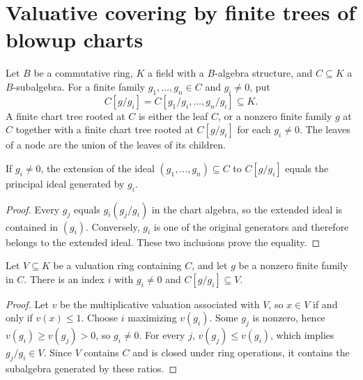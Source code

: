 \section{Valuative covering by finite trees of blowup charts}

\begin{definition}\label{def:sc0-rees-chart-tree}
\leanok
Let $B$ be a commutative ring, $K$ a field with a $B$-algebra structure, and $C\subseteq K$ a
$B$-subalgebra. For a finite family $g_1,\ldots,g_n\in C$ and $g_i\ne0$, put
\[
 C[g/g_i]=C[g_1/g_i,\ldots,g_n/g_i]\subseteq K.
\]
A finite chart tree rooted at $C$ is either the leaf $C$, or a nonzero finite family $g$ at $C$
together with a finite chart tree rooted at $C[g/g_i]$ for each $g_i\ne0$.
The leaves of a node are the union of the leaves of its children.
\end{definition}

\begin{lemma}\label{lem:sc0-rees-chart-principal}
\leanok
If $g_i\ne0$, the extension of the ideal $(g_1,\ldots,g_n)\subseteq C$ to $C[g/g_i]$ equals
the principal ideal generated by $g_i$.
\end{lemma}
\begin{proof}
Every $g_j$ equals $g_i(g_j/g_i)$ in the chart algebra, so the extended ideal is contained
in $(g_i)$. Conversely, $g_i$ is one of the original generators and therefore belongs to the
extended ideal. These two inclusions prove the equality.
\end{proof}

\begin{lemma}\label{lem:sc0-rees-chart-in-valuation-ring}
\leanok
Let $V\subseteq K$ be a valuation ring containing $C$, and let $g$ be a nonzero finite family in
$C$. There is an index $i$ with $g_i\ne0$ and $C[g/g_i]\subseteq V$.
\end{lemma}
\begin{proof}
Let $v$ be the multiplicative valuation associated with $V$, so $x\in V$ if and only if $v(x)\le1$.
Choose $i$ maximizing $v(g_i)$. Some $g_j$ is nonzero, hence $v(g_i)\ge v(g_j)>0$, so $g_i\ne0$.
For every $j$, $v(g_j)\le v(g_i)$, which implies $g_j/g_i\in V$. Since $V$ contains $C$ and is
closed under ring operations, it contains the subalgebra generated by these ratios.
\end{proof}

